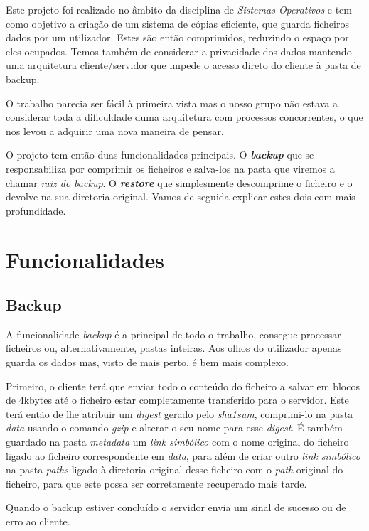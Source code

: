 \documentclass[12pt,a4paper]{report}
\begin{document}
Este projeto foi realizado no âmbito da disciplina de \emph{Sistemas Operativos} e tem como objetivo a criação de um sistema de cópias eficiente, que guarda ficheiros dados por um utilizador. Estes são então comprimidos, reduzindo o espaço por eles ocupados. Temos também de considerar a privacidade dos dados mantendo uma arquitetura cliente/servidor que impede o acesso direto do cliente à pasta de backup.\par
O trabalho parecia ser fácil à primeira vista mas o nosso grupo não estava a considerar toda a dificuldade duma arquitetura com processos concorrentes, o que nos levou a adquirir uma nova maneira de pensar.\par
O projeto tem então duas funcionalidades principais. O \emph{\bfseries{backup}} que se responsabiliza por comprimir os ficheiros e salva-los na pasta que viremos a chamar \emph{raiz do backup}. O \emph{\bfseries{restore}} que simplesmente descomprime o ficheiro e o devolve na sua diretoria original. Vamos de seguida explicar estes dois com mais profundidade.

\chapter{Funcionalidades}
\section{Backup}
A funcionalidade \emph{backup} é a principal de todo o trabalho, consegue processar ficheiros ou, alternativamente, pastas inteiras. Aos olhos do utilizador apenas guarda os dados mas, visto de mais perto, é bem mais complexo.\par Primeiro, o cliente terá que enviar todo o conteúdo do ficheiro a salvar em blocos de 4kbytes até o ficheiro estar completamente transferido para o servidor. Este terá então de lhe atribuir um \emph{digest} gerado pelo \emph{sha1sum}, comprimi-lo na pasta \emph{data}  usando o comando \emph{gzip} e alterar o seu nome para esse \emph{digest}. É também guardado na pasta \emph{metadata} um \emph{link simbólico} com o nome original do ficheiro ligado ao ficheiro correspondente em \emph{data}, para além de criar outro \emph{link simbólico} na pasta \emph{paths} ligado à diretoria original desse ficheiro com o \emph{path} original do ficheiro, para que este possa ser corretamente recuperado mais tarde.\par Quando o backup estiver concluído o servidor envia um sinal de sucesso ou de erro ao cliente.
\end{document}
